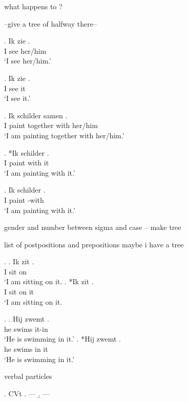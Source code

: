 \documentclass[xcolor=dvipsnames,10pt]{beamer}
\begin{document}
\begin{frame}

	what happens to ?

	--give a tree of halfway there--

\end{frame}


\begin{frame}

\exg. Ik zie .\\
 I see her/him\\
 `I see her/him.'\label{ex:aniobj}

\exg. Ik zie .\\
 I see it\\
 `I see it.'\label{ex:inaniobj}

\exg. Ik schilder samen  .\\
 I paint together with her/him\\
 `I am painting together with her/him.'\label{ex:prepani}

\exg. *Ik schilder  .\\
 I paint with it\\
 `I am painting with it.'\label{ex:prephet}

\exg. Ik schilder  .\\
 I paint  -with\\
 `I am painting with it.'\label{ex:preper}

gender and number between sigma and case -- make tree


\end{frame}


\begin{frame}

list of postpositions and prepositions
maybe i have a tree

\ex.
\ag. Ik zit  .\\
 I sit  on\\
 `I am sitting on it.
\bg. *Ik zit  .\\
 I sit on it\\
 `I am sitting on it.

\ex.
 \ag. Hij zwemt  .\\
  he swims it-in\\
  `He is swimming in it.'
 \bg. *Hij zwemt  .\\
  he swims in it\\
  `He is swimming in it.'

\pause

verbal particles

\ex. CVt
\a.  --- 
\b.  --- 

\end{frame}
\end{document}
